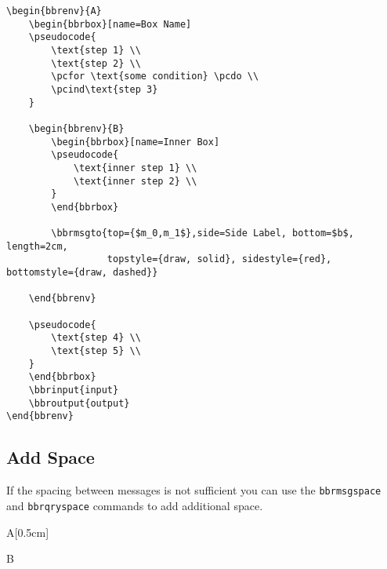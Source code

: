 \documentclass[a4paper]{report}
\begin{document}
\begin{lstlisting}
\begin{bbrenv}{A}
	\begin{bbrbox}[name=Box Name]
	\pseudocode{
		\text{step 1} \\
		\text{step 2} \\
		\pcfor \text{some condition} \pcdo \\
		\pcind\text{step 3}
	}

	\begin{bbrenv}{B}
		\begin{bbrbox}[name=Inner Box]
		\pseudocode{
			\text{inner step 1} \\
			\text{inner step 2} \\
		}
		\end{bbrbox}

		\bbrmsgto{top={$m_0,m_1$},side=Side Label, bottom=$b$, length=2cm,
				  topstyle={draw, solid}, sidestyle={red}, bottomstyle={draw, dashed}}

	\end{bbrenv}

	\pseudocode{
		\text{step 4} \\
		\text{step 5} \\
	}
	\end{bbrbox}
	\bbrinput{input}
	\bbroutput{output}
\end{bbrenv}
\end{lstlisting}


\subsection{Add Space}
If the spacing between messages is not sufficient you can use the \lstinline$bbrmsgspace$ and
\lstinline$bbrqryspace$ commands to add additional space.

\begin{bbrenv}[1cm]{A}[0.5cm]
	\begin{bbrbox}[name=Reduction]

	\begin{bbrenv}{B}

		\begin{bbrbox}[name=Adversary,minheight=3cm,xshift=4cm]

		\end{bbrbox}

		\bbrmsgspace{1.5cm}

		\bbrqryspace{1cm}

	\end{bbrenv}

	\end{bbrbox}
\end{bbrenv}
\end{document}
